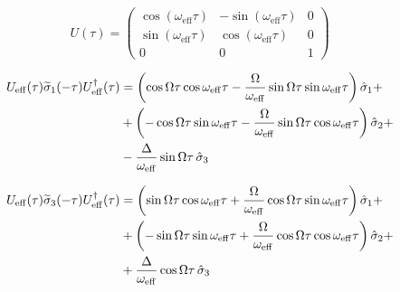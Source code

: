 \documentclass{article}
\begin{document}
\begin{equation}
  U(\tau) = 
  \begin{pmatrix}
    \cos(\omega_{\mathrm{eff}}\tau) &-\sin(\omega_{\mathrm{eff}}\tau) &0 \\
    \sin(\omega_{\mathrm{eff}}\tau) &\cos(\omega_{\mathrm{eff}}\tau)  &0 \\
    0                            &0                             &1
  \end{pmatrix}
\end{equation}

\begin{align}
    U_{\mathrm{eff}}(\tau) \widetilde{\sigma}_1(-\tau) U_{\mathrm{eff}}^\dagger
    (\tau) &= \left( \cos\Omega\tau \cos\omega_{\mathrm{eff}}\tau -
      \frac{\Omega}{\omega_{\mathrm{eff}}} \sin\Omega\tau
      \sin\omega_{\mathrm{eff}}\tau  \right) \hat{\sigma}_1 + \notag \\ 
    &+ \left( - \cos\Omega\tau \sin\omega_{\mathrm{eff}}\tau -
      \frac{\Omega}{\omega_{\mathrm{eff}}} \sin\Omega\tau
      \cos\omega_{\mathrm{eff}}\tau \right) \hat{\sigma}_2 + \notag \\
    &- \frac{\Delta}{\omega_{\mathrm{eff}}} \sin\Omega\tau \, \hat{\sigma}_3
\end{align}

\begin{align}
      U_{\mathrm{eff}}(\tau) \widetilde{\sigma}_3(-\tau) U_{\mathrm{eff}}^\dagger
    (\tau) &= \left( \sin\Omega\tau \cos\omega_{\mathrm{eff}}\tau +
      \frac{\Omega}{\omega_{\mathrm{eff}}} \cos\Omega\tau
      \sin\omega_{\mathrm{eff}}\tau  \right) \hat{\sigma}_1 + \notag \\
    &+ \left( -\sin\Omega\tau \sin\omega_{\mathrm{eff}}\tau +
      \frac{\Omega}{\omega_{\mathrm{eff}}} \cos\Omega\tau
      \cos\omega_{\mathrm{eff}}\tau  \right) \hat{\sigma}_2 + \notag \\
    &+ \frac{\Delta}{\omega_{\mathrm{eff}}} \cos\Omega\tau \, \hat{\sigma}_3
\end{align}


\end{document}
